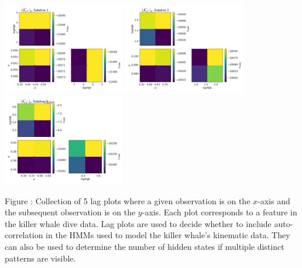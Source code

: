 \documentclass{article}
\begin{document}
        
        \begin{center}
        \includegraphics[width=2.1in]{../Plots/2019/20190902-182840-CATs_OB_1_0_267_CarHHMM2_fine-theta-likelihood-Ay-0.png}
        \includegraphics[width=2.1in]{../Plots/2019/20190902-182840-CATs_OB_1_0_267_CarHHMM2_fine-theta-likelihood-Ay-1.png}
        \includegraphics[width=2.1in]{../Plots/2019/20190902-182840-CATs_OB_1_0_267_CarHHMM2_fine-theta-likelihood-Ay-2.png}
        \end{center}
        
        \noindent Figure : Collection of 5 lag plots where a given observation is on the $x$-axis and the subsequent observation is on the $y$-axis. Each plot corresponds to a feature in the killer whale dive data. Lag plots are used to decide whether to include auto-correlation in the HMMs used to model the killer whale's kinematic data. They can also be used to determine the number of hidden states if multiple distinct patterns are visible. 
        \addtocounter{fignum}{1}
        
\end{document}
